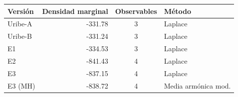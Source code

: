 \begin{tabular}{@{}lrcl@{}}
\toprule
Versi\'on & Densidad marginal & Observables & M\'etodo \\
\midrule
Uribe-A & -331.78 & 3 & Laplace \\
Uribe-B & -331.24 & 3 & Laplace \\
E1 & -334.53 & 3 & Laplace \\
E2 & -841.43 & 4 & Laplace \\
E3 & -837.15 & 4 & Laplace \\
E3 (MH) & -838.72 & 4 & Media arm\'onica mod. \\
\bottomrule
\end{tabular}
